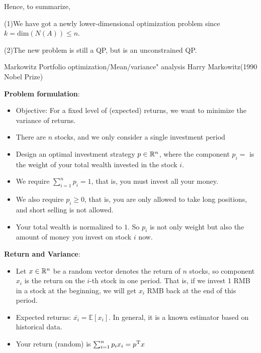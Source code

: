 Hence, to summarize,

(1)We have got a newly lower-dimensional optimization problem since $k =\text{dim}(N(A)) \leq n $.

(2)The new problem is still a QP, but is an unconstrained QP.



\begin{example}{Markowitz Portfolio optimization/Mean/variance" analysis}  Harry Markowitz(1990 Nobel Prize)
	
	
	\textbf{Problem formulation}: 
	\begin{itemize}
		\item Objective: For a fixed level of (expected) returns, we want to minimize the variance of returns.
		
		\item There are $n$ stocks, and we only consider a single investment period\\
		
		\item Design an optimal investment strategy $p\in \mathbb{R}^n$, where the component $p_i = $ is the weight of your total wealth invested in the stock $i$.
		
		\item We require $\sum^n_{i=1}p_i = 1$, that is, you must invest all your money.
		
		\item We also require $p_i \geq 0$, that is, you are only allowed to take long positions, and short selling is not allowed.
		
		\item Your total wealth is normalized to $1$. So $p_i$ is not only weight but also the amount of money you invest on stock $i$ now.
	\end{itemize} 
	
	\textbf{Return and Variance}:
	
	\begin{itemize}
		\item Let $x\in \mathbb{R}^n$ be a random vector denotes the return of $n$ stocks, so component $x_i$ is the return on the $i$-th stock in one period. That is, if we invest 1 RMB in a stock at the beginning, we will get $x_i$ RMB back at the end of this period.

		\item Expected returns: $\bar{x_i} = \mathbb{E}[x_i]$. In general, it is a known estimator based on historical data.
		
		\item Your return (random) is $\sum^n_{i=1}p_ix_i = p^{{\rm T}}x$
		

\end{itemize}
\end{example}

